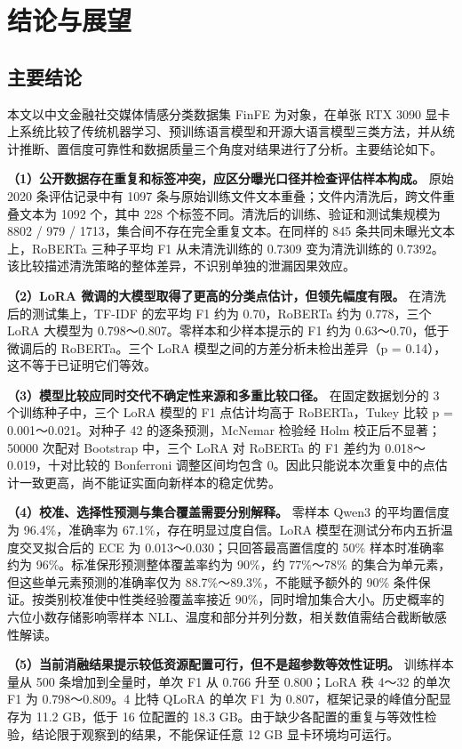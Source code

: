 \clearpage\section{结论与展望}

\FloatBarrier\subsection{主要结论}

本文以中文金融社交媒体情感分类数据集 FinFE 为对象，在单张 RTX 3090 显卡上系统比较了传统机器学习、预训练语言模型和开源大语言模型三类方法，并从统计推断、置信度可靠性和数据质量三个角度对结果进行了分析。主要结论如下。

\textbf{（1）公开数据存在重复和标签冲突，应区分曝光口径并检查评估样本构成。} 原始 2020 条评估记录中有 1097 条与原始训练文件文本重叠；文件内清洗后，跨文件重叠文本为 1092 个，其中 228 个标签不同。清洗后的训练、验证和测试集规模为 8802 / 979 / 1713，集合间不存在完全重复文本。在同样的 845 条共同未曝光文本上，RoBERTa 三种子平均 F1 从未清洗训练的 0.7309 变为清洗训练的 0.7392。该比较描述清洗策略的整体差异，不识别单独的泄漏因果效应。

\textbf{（2）LoRA 微调的大模型取得了更高的分类点估计，但领先幅度有限。} 在清洗后的测试集上，TF-IDF 的宏平均 F1 约为 0.70，RoBERTa 约为 0.778，三个 LoRA 大模型为 0.798～0.807。零样本和少样本提示的 F1 约为 0.63～0.70，低于微调后的 RoBERTa。三个 LoRA 模型之间的方差分析未检出差异（p = 0.14），这不等于已证明它们等效。

\textbf{（3）模型比较应同时交代不确定性来源和多重比较口径。} 在固定数据划分的 3 个训练种子中，三个 LoRA 模型的 F1 点估计均高于 RoBERTa，Tukey 比较 p = 0.001～0.021。对种子 42 的逐条预测，McNemar 检验经 Holm 校正后不显著；50000 次配对 Bootstrap 中，三个 LoRA 对 RoBERTa 的 F1 差约为 0.018～0.019，十对比较的 Bonferroni 调整区间均包含 0。因此只能说本次重复中的点估计一致更高，尚不能证实面向新样本的稳定优势。

\textbf{（4）校准、选择性预测与集合覆盖需要分别解释。} 零样本 Qwen3 的平均置信度为 96.4\%，准确率为 67.1\%，存在明显过度自信。LoRA 模型在测试分布内五折温度交叉拟合后的 ECE 为 0.013～0.030；只回答最高置信度的 50\% 样本时准确率约为 96\%。标准保形预测整体覆盖率约为 90\%，约 77\%～78\% 的集合为单元素，但这些单元素预测的准确率仅为 88.7\%～89.3\%，不能赋予额外的 90\% 条件保证。按类别校准使中性类经验覆盖率接近 90\%，同时增加集合大小。历史概率的六位小数存储影响零样本 NLL、温度和部分并列分数，相关数值需结合截断敏感性解读。

\textbf{（5）当前消融结果提示较低资源配置可行，但不是超参数等效性证明。} 训练样本量从 500 条增加到全量时，单次 F1 从 0.766 升至 0.800；LoRA 秩 4～32 的单次 F1 为 0.798～0.809。4 比特 QLoRA 的单次 F1 为 0.807，框架记录的峰值分配显存为 11.2 GB，低于 16 位配置的 18.3 GB。由于缺少各配置的重复与等效性检验，结论限于观察到的结果，不能保证任意 12 GB 显卡环境均可运行。

